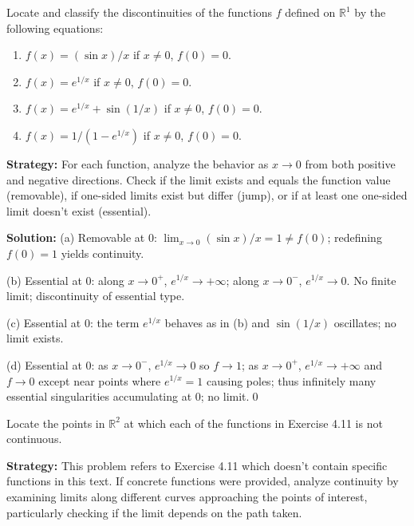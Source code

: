 \begin{problembox}
Locate and classify the discontinuities of the functions $f$ defined on $\mathbb{R}^1$ by the following equations:
\begin{enumerate}[label=(\alph*)]
\item $f(x) = (\sin x)/x$ if $x \neq 0$, $f(0) = 0$.
\item $f(x) = e^{1/x}$ if $x \neq 0$, $f(0) = 0$.
\item $f(x) = e^{1/x} + \sin(1/x)$ if $x \neq 0$, $f(0) = 0$.
\item $f(x) = 1/(1 - e^{1/x})$ if $x \neq 0$, $f(0) = 0$.
\end{enumerate}
\end{problembox}

\noindent\textbf{Strategy:} For each function, analyze the behavior as $x \to 0$ from both positive and negative directions. Check if the limit exists and equals the function value (removable), if one-sided limits exist but differ (jump), or if at least one one-sided limit doesn't exist (essential).

\bigskip\noindent\textbf{Solution:}
(a) Removable at $0$: $\lim_{x\to0}(\sin x)/x=1\ne f(0)$; redefining $f(0)=1$ yields continuity.

(b) Essential at $0$: along $x\to 0^+$, $e^{1/x}\to+\infty$; along $x\to0^-$, $e^{1/x}\to 0$. No finite limit; discontinuity of essential type.

(c) Essential at $0$: the term $e^{1/x}$ behaves as in (b) and $\sin(1/x)$ oscillates; no limit exists.

(d) Essential at $0$: as $x\to0^-$, $e^{1/x}\to0$ so $f\to 1$; as $x\to0^+$, $e^{1/x}\to+\infty$ and $f\to 0$ except near points where $e^{1/x}=1$ causing poles; thus infinitely many essential singularities accumulating at $0$; no limit.\qed



\begin{problembox}
Locate the points in $\mathbb{R}^2$ at which each of the functions in Exercise 4.11 is not continuous.
\end{problembox}

\noindent\textbf{Strategy:} This problem refers to Exercise 4.11 which doesn't contain specific functions in this text. If concrete functions were provided, analyze continuity by examining limits along different curves approaching the points of interest, particularly checking if the limit depends on the path taken.

